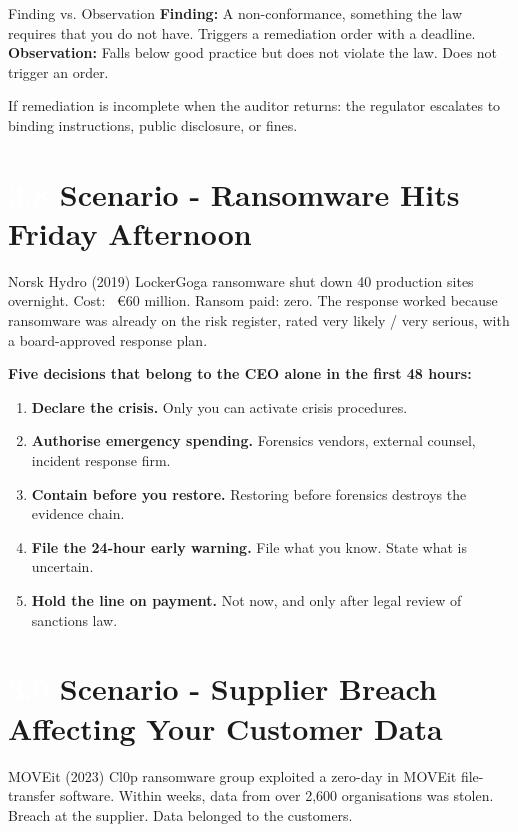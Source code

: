 \documentclass[11pt,a4paper,twoside]{book}
\newcommand{\lessontag}[1]{%
  \texorpdfstring{%
    \setlength{\fboxsep}{3pt}\colorbox{nisd2blue}{\textcolor{white}{\footnotesize\bfseries #1}}\quad%
  }{Lesson #1\ }%
}
\begin{document}
\begin{definitionbox}{Finding vs. Observation}
\textbf{Finding:} A non-conformance, something the law requires that you do not have. Triggers a remediation order with a deadline. \\
\textbf{Observation:} Falls below good practice but does not violate the law. Does not trigger an order.
\end{definitionbox}

If remediation is incomplete when the auditor returns: the regulator escalates to binding instructions, public disclosure, or fines.

\section{\lessontag{3.8}Scenario - Ransomware Hits Friday Afternoon}

\begin{casestudy}{Norsk Hydro (2019)}
LockerGoga ransomware shut down 40 production sites overnight. Cost: ~€60 million. Ransom paid: zero. The response worked because ransomware was already on the risk register, rated very likely / very serious, with a board-approved response plan.
\end{casestudy}

\textbf{Five decisions that belong to the CEO alone in the first 48 hours:}

\begin{enumerate}
  \item \textbf{Declare the crisis.} Only you can activate crisis procedures.
  \item \textbf{Authorise emergency spending.} Forensics vendors, external counsel, incident response firm.
  \item \textbf{Contain before you restore.} Restoring before forensics destroys the evidence chain.
  \item \textbf{File the 24-hour early warning.} File what you know. State what is uncertain.
  \item \textbf{Hold the line on payment.} Not now, and only after legal review of sanctions law.
\end{enumerate}

\section{\lessontag{3.9}Scenario - Supplier Breach Affecting Your Customer Data}

\begin{casestudy}{MOVEit (2023)}
Cl0p ransomware group exploited a zero-day in MOVEit file-transfer software. Within weeks, data from over 2,600 organisations was stolen. Breach at the supplier. Data belonged to the customers.
\end{casestudy}
\end{document}
